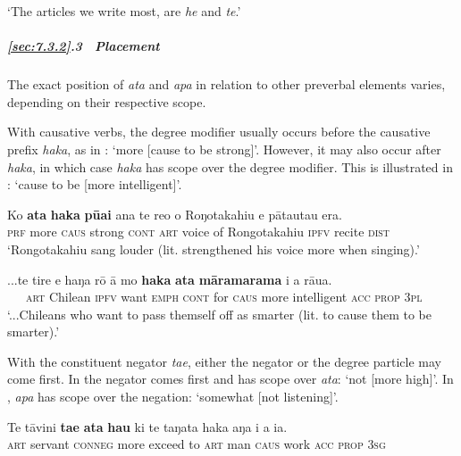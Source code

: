 \glt 
‘The articles we write most, are \textit{he} and \textit{te}.’ \textstyleExampleref{[R616.719]} 
\z

\subparagraph{\ref{sec:7.3.2}.3~ Placement} The exact position of \textit{{\ꞌ}ata} and \textit{{\ꞌ}apa} in relation to other preverbal elements varies, depending on their respective scope.

With causative verbs, the degree modifier usually occurs before the causative prefix \textit{haka}, as in : ‘more [cause to be strong]’. However, it may also occur after \textit{haka}, in which case \textit{haka} has scope over the degree modifier. This is illustrated in : ‘cause to be [more intelligent]’.

\ea\label{ex:7.98}
\gll Ko \textbf{{\ꞌ}ata} \textbf{haka} \textbf{pūai} {\ꞌ}ana te re{\ꞌ}o o Roŋotakahiu e pāta{\ꞌ}uta{\ꞌ}u era. \\
\textsc{prf} more \textsc{caus} strong \textsc{cont} \textsc{art} voice of Rongotakahiu \textsc{ipfv} recite \textsc{dist} \\

\glt 
‘Rongotakahiu sang louder (lit. strengthened his voice more when singing).’ \textstyleExampleref{[R476.014]} 
\z

\ea\label{ex:7.99}
\gll ...te tire e haŋa rō {\ꞌ}ā mo \textbf{haka} \textbf{{\ꞌ}ata} \textbf{māramarama} i a rāua.\\
~~~\textsc{art} Chilean \textsc{ipfv} want \textsc{emph} \textsc{cont} for \textsc{caus} more intelligent \textsc{acc} \textsc{prop} \textsc{3pl}\\

\glt
‘...Chileans who want to pass themself off as smarter (lit. to cause them to be smarter).’ \textstyleExampleref{[R428.006]} 
\z

With the constituent negator \textit{ta{\ꞌ}e}, either the negator or the degree particle may come first. In  the negator comes first and has scope over \textit{{\ꞌ}ata}: ‘not [more high]’. In , \textit{{\ꞌ}apa} has scope over the negation: ‘somewhat [not listening]’.

\ea\label{ex:7.100}
\gll Te tāvini \textbf{ta{\ꞌ}e} \textbf{{\ꞌ}ata} \textbf{hau} ki te taŋata haka aŋa i a ia. \\
\textsc{art} servant \textsc{conneg} more exceed to \textsc{art} man \textsc{caus} work \textsc{acc} \textsc{prop} \textsc{3sg} \\

